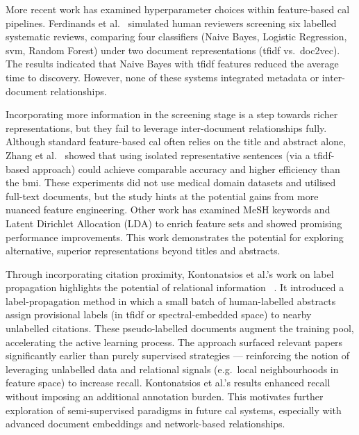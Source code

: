 \documentclass[10pt,oneside]{book}
\begin{document}

More recent work has examined hyperparameter choices within feature-based \gls*{cal} pipelines. Ferdinands et al.~\cite{ferdinands_performance_2023} simulated human reviewers screening six labelled systematic reviews, comparing four classifiers (Naive Bayes, Logistic Regression, \gls*{svm}, Random Forest) under two document representations (\gls*{tfidf} vs.\ doc2vec). The results indicated that Naive Bayes with \gls*{tfidf} features reduced the average time to discovery. However, none of these systems integrated metadata or inter-document relationships.

Incorporating more information in the screening stage is a step towards richer representations, but they fail to leverage inter-document relationships fully. Although standard feature-based \gls*{cal} often relies on the title and abstract alone, Zhang et al.~\cite{zhang_evaluating_2020} showed that using isolated representative sentences (via a \gls*{tfidf}-based approach) could achieve comparable accuracy and higher efficiency than the \gls*{bmi}. These experiments did not use medical domain datasets and utilised full-text documents, but the study hints at the potential gains from more nuanced feature engineering. Other work has examined MeSH keywords \cite{miwa_reducing_2014} and Latent Dirichlet Allocation (LDA) \cite{hashimoto_topic_2016, miwa_reducing_2014} to enrich feature sets and showed promising performance improvements. This work demonstrates the potential for exploring alternative, superior representations beyond titles and abstracts.

Through incorporating citation proximity, Kontonatsios et al.'s work on label propagation highlights the potential of relational information ~\cite{kontonatsios_semi-supervised_2017}. It introduced a label-propagation method in which a small batch of human-labelled abstracts assign provisional labels (in \gls*{tfidf} or spectral-embedded space) to nearby unlabelled citations. These pseudo-labelled documents augment the training pool, accelerating the active learning process. The approach surfaced relevant papers significantly earlier than purely supervised strategies — reinforcing the notion of leveraging unlabelled data and relational signals (e.g.\ local neighbourhoods in feature space) to increase recall. Kontonatsios et al.’s results enhanced recall without imposing an additional annotation burden. This motivates further exploration of semi-supervised paradigms in future \gls*{cal} systems, especially with advanced document embeddings and network-based relationships.
\end{document}
